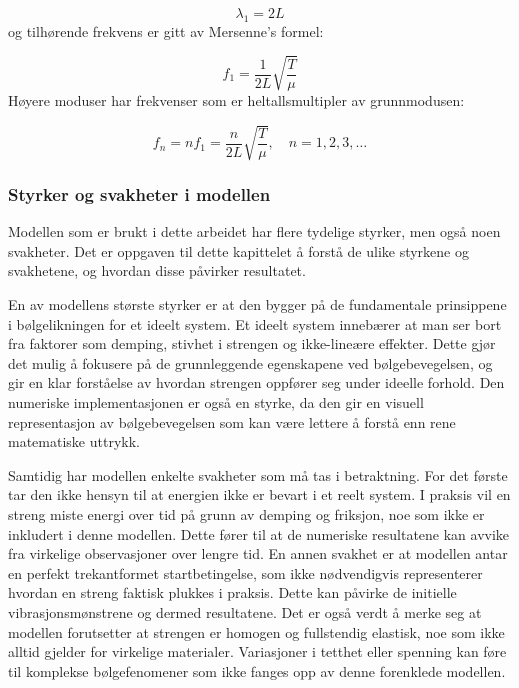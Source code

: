 \begin{equation*}
\lambda_1 = 2L
\end{equation*}
og tilhørende frekvens er gitt av Mersenne's formel:

\begin{equation*}
f_1 = \frac{1}{2L} \sqrt{\frac{T}{\mu}}
\end{equation*}
Høyere moduser har frekvenser som er heltallsmultipler av grunnmodusen:

\begin{equation*}
f_n = n f_1 = \frac{n}{2L} \sqrt{\frac{T}{\mu}}, \quad n = 1, 2, 3, \dots
\end{equation*}
\subsubsection{Styrker og svakheter i modellen}
Modellen som er brukt i dette arbeidet har flere tydelige styrker, men også noen svakheter. Det er 
oppgaven til dette kapittelet å forstå de ulike styrkene og svakhetene, og hvordan disse påvirker 
resultatet.

En av modellens største styrker er at den bygger på de fundamentale prinsippene i bølgelikningen for
et ideelt system. Et ideelt system innebærer at man ser bort fra faktorer som demping, stivhet i strengen
og ikke-lineære effekter. Dette gjør det mulig å fokusere på de grunnleggende egenskapene ved 
bølgebevegelsen, og gir en klar forståelse av hvordan strengen oppfører seg under ideelle forhold. 
Den numeriske implementasjonen er også en styrke, da den gir en visuell representasjon av 
bølgebevegelsen som kan være lettere å forstå enn rene matematiske uttrykk.

Samtidig har modellen enkelte svakheter som må tas i betraktning. For det første tar den ikke hensyn
til at energien ikke er bevart i et reelt system. I praksis vil en streng miste energi over tid på grunn av
demping og friksjon, noe som ikke er inkludert i denne modellen. Dette fører til at de numeriske resultatene kan avvike
fra virkelige observasjoner over lengre tid. En annen svakhet er at modellen antar en perfekt trekantformet startbetingelse,
som ikke nødvendigvis representerer hvordan en streng faktisk plukkes i praksis. Dette kan påvirke de initielle 
vibrasjonsmønstrene og dermed resultatene. Det er også verdt å merke seg at modellen forutsetter at strengen er homogen 
og fullstendig elastisk, noe som ikke alltid gjelder for virkelige materialer. Variasjoner i tetthet eller spenning kan føre til komplekse 
bølgefenomener som ikke fanges opp av denne forenklede modellen.

